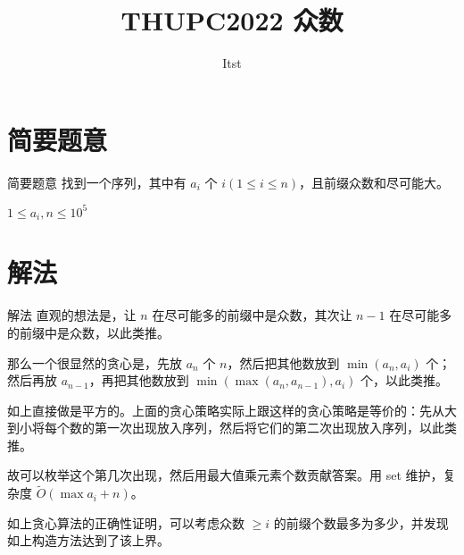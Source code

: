 \documentclass{beamer}
\title{THUPC2022 众数}
\author{Itst}
\institute{THU\ IIIS}
\begin{document}
\begin{frame}
\titlepage
\end{frame}
\section{简要题意}
\begin{frame}{简要题意}
	找到一个序列，其中有 $a_i$ 个 $i(1 \le i \le n)$，且前缀众数和尽可能大。

	$1 \le a_i,n \le 10^5$
\end{frame}
\section{解法}
\begin{frame}{解法}
	直观的想法是，让 $n$ 在尽可能多的前缀中是众数，其次让 $n-1$ 在尽可能多的前缀中是众数，以此类推。

	那么一个很显然的贪心是，先放 $a_n$ 个 $n$，然后把其他数放到 $\min(a_n,a_i)$ 个；然后再放 $a_{n-1}$，再把其他数放到 $\min(\max(a_n,a_{n-1}),a_i)$ 个，以此类推。\pause

	如上直接做是平方的。上面的贪心策略实际上跟这样的贪心策略是等价的：先从大到小将每个数的第一次出现放入序列，然后将它们的第二次出现放入序列，以此类推。

	故可以枚举这个第几次出现，然后用最大值乘元素个数贡献答案。用 set 维护，复杂度 $\tilde{O}(\max a_i + n)$。\pause 

	如上贪心算法的正确性证明，可以考虑众数 $\ge i$ 的前缀个数最多为多少，并发现如上构造方法达到了该上界。
\end{frame}
\end{document}
